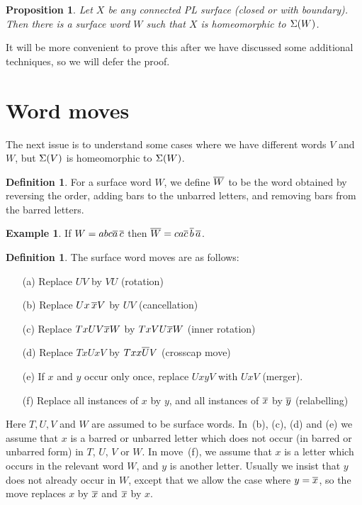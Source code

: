 \documentclass[reqno]{amsart}
\newtheorem{proposition}[theorem]{Proposition}
\theoremstyle{definition}
\newtheorem{definition}[theorem]{Definition}
\newtheorem{example}[theorem]{Example}
\begin{document}
\begin{proposition}\label{prop-word-exists}
 Let $X$ be any connected PL surface (closed or with boundary).  Then
 there is a surface word $W$ such that $X$ is homeomorphic to $\Sigma(W)$.
\end{proposition}
It will be more convenient to prove this after we have discussed some
additional techniques, so we will defer the proof.

\section{Word moves}
\label{sec-word-moves}

The next issue is to understand some cases where we have different
words $V$ and $W$, but $\Sigma(V)$ is homeomorphic to $\Sigma(W)$.

\begin{definition}
 For a surface word $W$, we define $\overline{W}$ to be the word obtained by
 reversing the order, adding bars to the unbarred letters, and
 removing bars from the barred letters.
\end{definition}

\begin{example}
 If $W=abc\overline{a}\,\overline{c}$ then $\overline{W}=ca\overline{c}\,\overline{b}\,\overline{a}$.
\end{example}

\begin{definition}
 The surface word moves are as follows:
 \begin{itemize}
  \item[(a)] Replace $UV$ by $VU$ (rotation)
  \item[(b)] Replace $Ux\,\overline{x} V$ by $UV$ (cancellation)
  \item[(c)] Replace $TxUV\overline{x} W$ by $TxVU\overline{x} W$ (inner rotation)
  \item[(d)] Replace $TxUxV$ by $Txx\overline{U}V$ (crosscap move)
  \item[(e)] If $x$ and $y$ occur only once, replace $UxyV$ with $UxV$
   (merger). 
  \item[(f)] Replace all instances of $x$ by $y$, and all instances of
   $\overline{x}$ by $\overline{y}$ (relabelling)
 \end{itemize}
 Here $T,U,V$ and $W$ are assumed to be surface words.  In~(b), (c), (d) and
 (e) we assume that $x$ is a barred or unbarred letter which does not
 occur (in barred or unbarred form) in $T$, $U$, $V$ or $W$.  In move~(f),
 we assume that $x$ is a letter which occurs in the relevant word $W$,
 and $y$ is another letter.  Usually we insist that $y$ does not
 already occur in $W$, except that we allow the case where $y=\overline{x}$,
 so the move replaces $x$ by $\overline{x}$ and $\overline{x}$ by $x$.
\end{definition}
\end{document}
